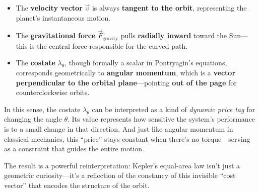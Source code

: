 \begin{itemize}
  \item The \textbf{velocity vector} $\vec{v}$ is always \textbf{tangent to the orbit}, representing the planet’s instantaneous motion.
  \item The \textbf{gravitational force} $\vec{F}_{\text{gravity}}$ pulls \textbf{radially inward} toward the Sun—this is the central force responsible for the curved path.
  \item The \textbf{costate} $\lambda_\theta$, though formally a scalar in Pontryagin’s equations, corresponds geometrically to \textbf{angular momentum}, which is a \textbf{vector perpendicular to the orbital plane}—pointing \textbf{out of the page} for counterclockwise orbits.
\end{itemize}

In this sense, the costate $\lambda_\theta$ can be interpreted as a kind of \emph{dynamic price tag} for changing the angle $\theta$. Its value represents how sensitive the system’s performance is to a small change in that direction. And just like angular momentum in classical mechanics, this “price” stays constant when there’s no torque—serving as a constraint that guides the entire motion.

The result is a powerful reinterpretation: Kepler’s equal-area law isn’t just a geometric curiosity—it’s a reflection of the constancy of this invisible “cost vector” that encodes the structure of the orbit.



